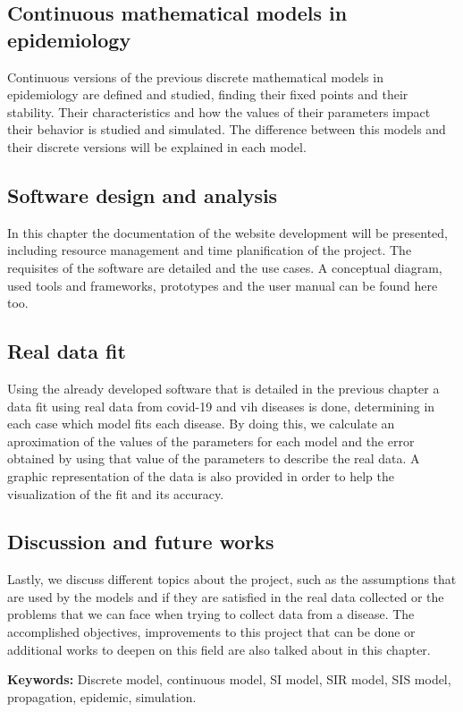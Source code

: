 \subsection*{Continuous mathematical models in epidemiology}

Continuous versions of the previous discrete mathematical models in epidemiology are defined and studied, finding their fixed points and their stability. Their characteristics and how the values of their parameters impact their behavior is studied and simulated. The difference between this models and their discrete versions will be explained in each model.

\subsection*{Software design and analysis}

In this chapter the documentation of the website development will be presented, including resource management and time planification of the project. The requisites of the software are detailed and the use cases. A conceptual diagram, used tools and frameworks, prototypes and the user manual can be found here too.

\subsection*{Real data fit}

Using the already developed software that is detailed in the previous chapter a data fit using real data from covid-19 and vih diseases is done, determining in each case which model fits each disease. By doing this, we calculate an aproximation of the values of the parameters for each model and the error obtained by using that value of the parameters to describe the real data. A graphic representation of the data is also provided in order to help the visualization of the fit and its accuracy.

\subsection*{Discussion and future works}

Lastly, we discuss different topics about the project, such as the assumptions that are used by the models and if they are satisfied in the real data collected or the problems that we can face when trying to collect data from a disease. The accomplished objectives, improvements to this project that can be done or additional works to deepen on this field are also talked about in this chapter.

\textbf{Keywords: } Discrete model, continuous model, SI model, SIR model, SIS model, propagation, epidemic, simulation.
